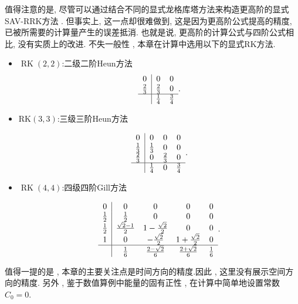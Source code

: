 值得注意的是, 尽管可以通过结合不同的显式龙格库塔方法来构造更高阶的显式SAV-RRK方法 .
但事实上, 这一点却很难做到, 这是因为更高阶公式提高的精度, 已被所需要的计算量产生的误差抵消. 
也就是说, 更高阶的计算公式与四阶公式相比, 没有实质上的改进.
不失一般性 , 本章在计算中选用以下的显式RK方法\cite{shuEfficientImplementationEssentially1988}.
\begin{itemize}
\item $\operatorname{RK}(2 , 2)$:二级二阶Heun方法%
\begin{equation}
\begin{array}{c|cc}
0 & 0 & 0 \\
\frac{2}{3} & \frac{2}{3} & 0 \\
\hline & \frac{1}{4} & \frac{3}{4}
\end{array}.
\end{equation}
	
\item $\mathrm{RK}(3 , 3)$:三级三阶Heun方法%
	
\begin{equation}
\begin{array}{c|ccc}
0 & 0 & 0 & 0 \\
\frac{1}{3} & \frac{1}{3} & 0 & 0 \\
\frac{2}{3} & 0 & \frac{2}{3} & 0 \\
\hline & \frac{1}{4} & 0 & \frac{3}{4}
\end{array}.
\end{equation}
		
\item $\operatorname{RK}(4 , 4)$:四级四阶Gill方法%
		
\begin{equation}
\begin{array}{c|cccc}
0 & 0 & 0 & 0 & 0 \\
\frac{1}{2} & \frac{1}{2} & 0 & 0 & 0 \\
\frac{1}{2} & \frac{\sqrt{2}-1}{2} & 1-\frac{\sqrt{2}}{2} & 0 & 0 \\
1 & 0 & -\frac{\sqrt{2}}{2} & 1+\frac{\sqrt{2}}{2} & 0 \\
\hline & \frac{1}{6} & \frac{2-\sqrt{2}}{6} & \frac{2+\sqrt{2}}{6} & \frac{1}{6}
\end{array}.
\end{equation}
\end{itemize}

值得一提的是 , 本章的主要关注点是时间方向的精度.因此 , 这里没有展示空间方向的精度.
另外 , 鉴于数值算例中能量的固有正性 , 在计算中简单地设置常数$C_0=0$.

